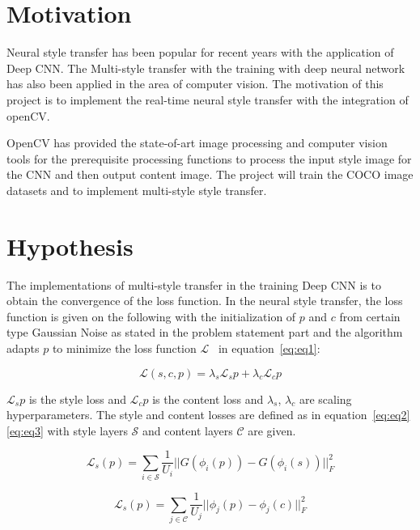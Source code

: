 \documentclass[11pt, a4paper]{article}
\begin{document}
\section{Motivation}

Neural style transfer has been popular for recent years with the application of Deep CNN. The Multi-style transfer with the training with deep neural network has also been applied in the area of computer vision. The motivation of this project is to implement the real-time neural style transfer with the integration of openCV. 

OpenCV has provided the state-of-art image processing and computer vision tools for the prerequisite processing functions to process the input style image for the CNN and then output content image. The project will train the COCO image datasets and to implement multi-style style transfer. 

\section{Hypothesis}

The implementations of multi-style transfer in the training Deep CNN is to obtain the convergence of the loss function. In the neural style transfer, the loss function is given on the following with the initialization of $p$ and $c$ from certain type Gaussian Noise as stated in the problem statement part and the algorithm adapts $p$ to minimize the loss function $\mathcal{L}$~\cite{ref:source3} in equation~\ref{eq:eq1}:

\begin{equation}
\label{eq:eq1}
\mathcal{L}(s,c,p) = \lambda_{s}\mathcal{L}_{s}{p} + \lambda_{c}\mathcal{L}_{c}{p}
\end{equation} 

$\mathcal{L}_{s}{p}$ is the style loss and $\mathcal{L}_{c}{p}$ is the content loss and $\lambda_{s}$, $\lambda_{c}$ are scaling hyperparameters. The style and content losses are defined as in equation~\ref{eq:eq2}\ref{eq:eq3} with style layers $\mathcal{S}$ and content layers $\mathcal{C}$ are given. 
 
\begin{equation}
\label{eq:eq2}
\mathcal{L}_{s}(p) = \sum_{i\in \mathcal{S}} \frac{1}{U_{i}} || G(\phi_{i}(p)) - G(\phi_{i}(s)) {||}^{2}_{F}
\end{equation} 

\begin{equation}
\label{eq:eq3}
\mathcal{L}_{s}(p) = \sum_{j\in \mathcal{C}} \frac{1}{U_{j}} ||\phi_{j}(p) - \phi_{j}(c) {||}^{2}_{F}
\end{equation} 
\end{document}
